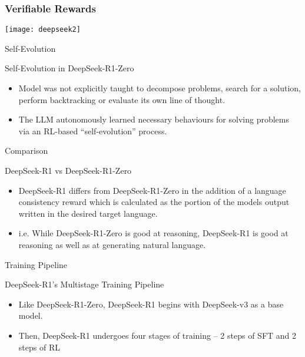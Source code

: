 \begin{frame}[fragile]\frametitle{ Verifiable Rewards}
		\begin{center}
		\texttt{[image: deepseek2]}
		\end{center}

\end{frame}

\begin{frame}[fragile]{Self-Evolution}

Self-Evolution in DeepSeek-R1-Zero

    \begin{itemize}
        \item    Model was not explicitly taught to decompose problems, search for a 
solution, perform backtracking or evaluate its own line of thought. 
        \item   The LLM autonomously learned necessary behaviours for solving 
problems via an RL-based ``self-evolution'' process. 
    \end{itemize}
\end{frame}

\begin{frame}[fragile]{Comparison}

DeepSeek-R1 vs DeepSeek-R1-Zero

    \begin{itemize}
        \item    DeepSeek-R1 differs from DeepSeek-R1-Zero in the addition of a 
language consistency reward which is calculated as the portion of the 
models output written in the desired target language. 
        \item    i.e. While DeepSeek-R1-Zero is good at reasoning, DeepSeek-R1 is good 
at reasoning as well as at generating natural language.
    \end{itemize}
\end{frame}


\begin{frame}[fragile]{ Training Pipeline}

DeepSeek-R1's Multistage Training Pipeline

    \begin{itemize}
        \item     Like DeepSeek-R1-Zero, DeepSeek-R1 begins with DeepSeek-v3 as a 
base model. 
        \item     Then, DeepSeek-R1 undergoes four stages of training – 2 steps of SFT 
and 2 steps of RL
    \end{itemize}
\end{frame}

